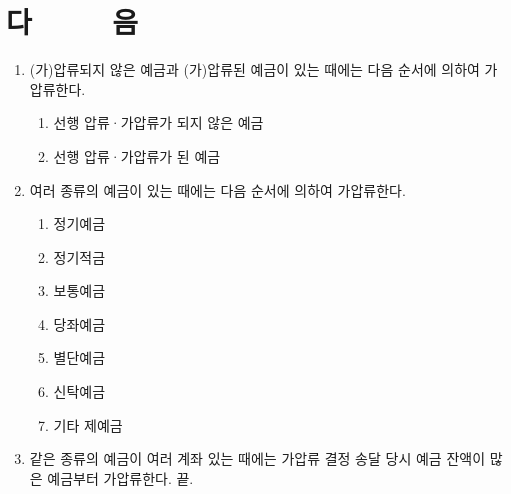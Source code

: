 \documentclass[12pt]{oblivoir}
\def\mysection#1{\hfil #1 \hfil} %
\begin{document}
\section*{\mysection{다~~~~~음}}
\begin{enumerate}[nosep]
  \item (가)압류되지 않은 예금과 (가)압류된 예금이 있는 때에는 다음 순서에 의하여 가압류한다.
    \begin{enumerate}[nosep, label=\gana*.]
    \item 선행 압류·가압류가 되지 않은 예금
    \item 선행 압류·가압류가 된 예금
    \end{enumerate}
  \item 여러 종류의 예금이 있는 때에는 다음 순서에 의하여 가압류한다.
    \begin{enumerate}[nosep, label=\gana*.]
      \item 정기예금
      \item 정기적금
      \item 보통예금
      \item 당좌예금
      \item 별단예금
      \item 신탁예금
      \item 기타 제예금
   \end{enumerate}
 \item 같은 종류의 예금이 여러 계좌 있는 때에는 가압류 결정 송달 당시 예금 잔액이 많은 예금부터 가압류한다. 끝.
 \end{enumerate}
\end{document}
